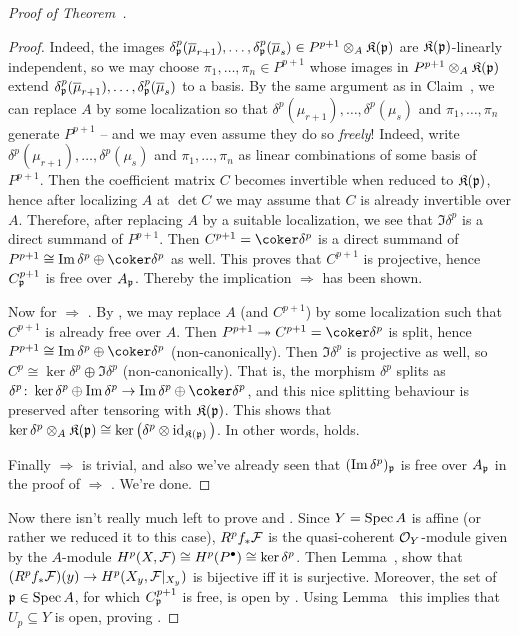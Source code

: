 \documentclass[a4paper,parskip=half,numbers=enddot, DIV=12]{scrreprt}
\begin{document}
\begin{proof}[Proof of Theorem~]
\begin{proof}
	Indeed, the images $\delta_{\mathfrak{p}}^p(\overline{\mu}_{r+1}),\ldots,\delta_{\mathfrak{p}}^p(\overline{\mu}_s)\in P^{p+1}\otimes_A\mathfrak{K}(\mathfrak{p})$ are $\mathfrak{K}(\mathfrak{p})$-linearly independent, so we may choose $\pi_1,\ldots,\pi_n\in P^{p+1}$ whose images in $P^{p+1}\otimes_A\mathfrak{K}(\mathfrak{p})$ extend $\delta_{\mathfrak{p}}^p(\overline{\mu}_{r+1}),\ldots,\delta_{\mathfrak{p}}^p(\overline{\mu}_s)$ to a basis.
	By the same argument as in Claim~, we can replace $A$ by some localization so that $\delta^p(\mu_{r+1}),\ldots,\delta^p(\mu_s)$ and $\pi_1,\ldots,\pi_n$ generate $P^{p+1}$ -- and we may even assume they do so \emph{freely}! Indeed, write $\delta^p(\mu_{r+1}),\ldots,\delta^p(\mu_s)$ and $\pi_1,\ldots,\pi_n$ as linear combinations of some basis of $P^{p+1}$. Then the coefficient matrix $C$ becomes invertible when reduced to $\mathfrak{K}(\mathfrak{p})$, hence after localizing $A$ at $\det C$ we may assume that $C$ is already invertible over $A$. Therefore, after replacing $A$ by a suitable localization, we see that $\Im\delta^p$ is a direct summand of $P^{p+1}$. Then $C^{p+1}=\coker\delta^p$ is a direct summand of $P^{p+1}\cong \Im\delta^p\oplus\coker\delta^p$ as well. This proves that $C^{p+1}$ is projective, hence $C^{p+1}_{\mathfrak{p}}$ is free over $A_{\mathfrak{p}}$. Thereby the implication  $\Rightarrow$  has been shown.
	
	Now for  $\Rightarrow$ . By \cite[Corollary~1.5.1]{alg2}, we may replace $A$ (and $C^{p+1}$) by some localization such that $C^{p+1}$ is already free over $A$. Then $P^{p+1}\epimorphism C^{p+1}=\coker\delta^p$ is split, hence $P^{p+1}\cong \Im\delta^p\oplus \coker\delta^p$ (non-canonically). Then $\Im\delta^p$ is projective as well, so $C^p\cong \ker\delta^p\oplus\Im\delta^p$ (non-canonically). That is, the morphism $\delta^p$ splits as $\delta^p\colon \ker\delta^p\oplus\Im\delta^p\morphism\Im\delta^p\oplus\coker\delta^p$, and this nice splitting behaviour is preserved after tensoring with $\mathfrak{K}(\mathfrak{p})$. This shows that $\ker\delta^p\otimes_A\mathfrak{K}(\mathfrak{p})\cong \ker\big(\delta^p\otimes\operatorname{id}_{\mathfrak{K}(\mathfrak{p})}\big)$. In other words,  holds.
	
	Finally  $\Rightarrow$  is trivial, and also we've already seen that $(\operatorname{Im} \delta^p)_{\mathfrak{p}}$ is free over $A_{\mathfrak{p}}$ in the proof of  $\Rightarrow$ . We're done.
\end{proof}

	Now there isn't really much left to prove  and . Since $Y=\operatorname{Spec} A$ is affine (or rather we reduced it to this case), $R^pf_*\mathcal{F}$ is the quasi-coherent $\mathcal{O}_Y$-module given by the $A$-module $H^p(X,\mathcal{F})\cong H^p(P^\bullet)\cong \ker\delta^p$. Then Lemma~,  show that $(R^pf_*\Ff)(y)\morphism H^p(X_y,\Ff|_{X_y})$ is bijective iff it is surjective. Moreover, the set of $\mathfrak{p}\in\operatorname{Spec} A$, for which $C_{\mathfrak{p}}^{p+1}$ is free, is open by \cite[Corollary~1.5.1]{alg2}. Using Lemma~ this implies that $U_p\subseteq Y$ is open, proving .
	

\end{proof}
\end{document}
